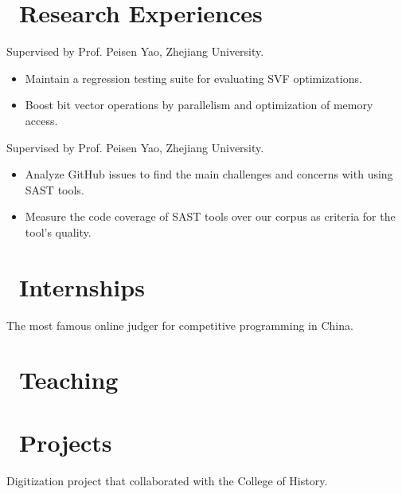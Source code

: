 \documentclass{resume}
\begin{document}
\section{\faSearch\ Research Experiences}
Supervised by Prof. Peisen Yao, Zhejiang University.
\begin{itemize}
  \item Maintain a regression testing suite for evaluating SVF optimizations.
  \item Boost bit vector operations by parallelism and optimization of memory access.
\end{itemize}

Supervised by Prof. Peisen Yao, Zhejiang University.
\begin{itemize}
  \item Analyze GitHub issues to find the main challenges and concerns with using SAST tools.
  \item Measure the code coverage of SAST tools over our corpus as criteria for the tool's quality.
\end{itemize}

\section{\faUsers\ Internships}
The most famous online judger for competitive programming in China.

\section{\faBook\ Teaching}

\section{\faCode\ Projects}
Digitization project that collaborated with the College of History.
\end{document}

